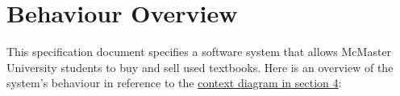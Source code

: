 \documentclass[fullpage]{article}
\begin{document}
\section{Behaviour Overview}

\noindent This specification document specifies a software system that allows McMaster University students to buy and sell used textbooks. Here is an overview of the system's behaviour in reference to the \hyperref[sec:context]{context diagram in section 4}:
\end{document}
